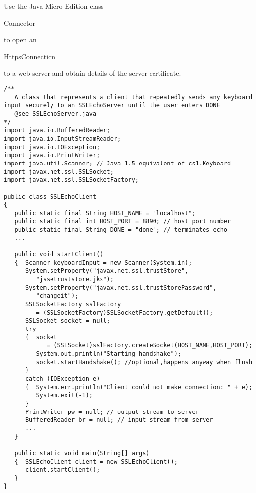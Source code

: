 \begin{exercise}
	Use the Java Micro Edition class \begin{code}Connector\end{code} to open an
	\begin{code}HttpsConnection\end{code} to a web server and obtain details of
	the server certificate.
\end{exercise}

\begin{lstlisting}[caption=SSLEchoServer]
/**
   A class that represents a client that repeatedly sends any keyboard input securely to an SSLEchoServer until the user enters DONE
   @see SSLEchoServer.java
*/
import java.io.BufferedReader;
import java.io.InputStreamReader;
import java.io.IOException;
import java.io.PrintWriter;
import java.util.Scanner; // Java 1.5 equivalent of cs1.Keyboard
import javax.net.ssl.SSLSocket;
import javax.net.ssl.SSLSocketFactory;

public class SSLEchoClient
{
   public static final String HOST_NAME = "localhost";
   public static final int HOST_PORT = 8890; // host port number
   public static final String DONE = "done"; // terminates echo
   ...

   public void startClient()
   {  Scanner keyboardInput = new Scanner(System.in);
      System.setProperty("javax.net.ssl.trustStore",
         "jssetruststore.jks");
      System.setProperty("javax.net.ssl.trustStorePassword",
         "changeit");
      SSLSocketFactory sslFactory
         = (SSLSocketFactory)SSLSocketFactory.getDefault();
      SSLSocket socket = null;
      try
      {  socket
            = (SSLSocket)sslFactory.createSocket(HOST_NAME,HOST_PORT);
         System.out.println("Starting handshake");
         socket.startHandshake(); //optional,happens anyway when flush
      }
      catch (IOException e)
      {  System.err.println("Client could not make connection: " + e);
         System.exit(-1);
      }
      PrintWriter pw = null; // output stream to server
      BufferedReader br = null; // input stream from server
      ...
   }

   public static void main(String[] args)
   {  SSLEchoClient client = new SSLEchoClient();
      client.startClient();
   }
}
\end{lstlisting}


